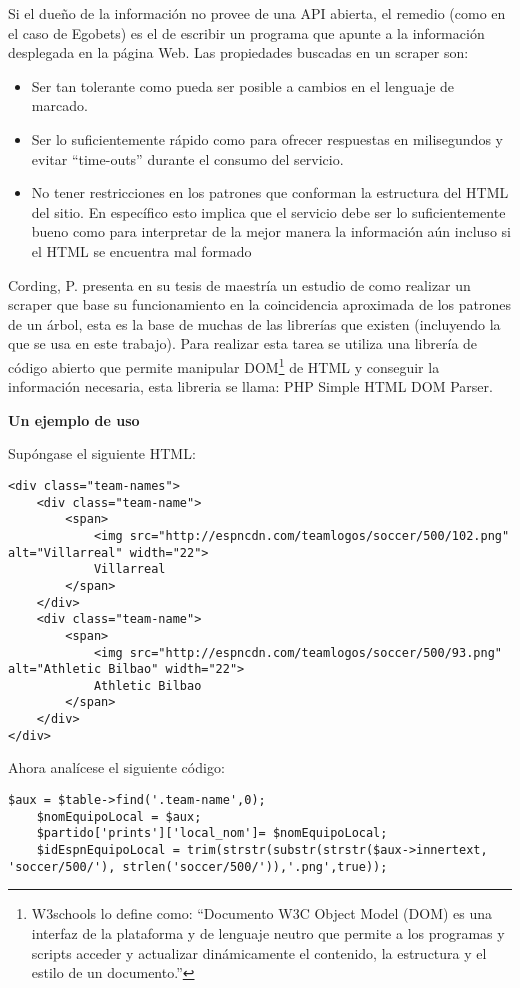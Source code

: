 Si el dueño de la información no provee de una API abierta, el remedio (como en el caso de Egobets) es el de escribir un programa que apunte a la información desplegada en la página Web. Las propiedades buscadas en un scraper son:
\begin{itemize}
	\item Ser tan tolerante como pueda ser posible a cambios en el lenguaje de marcado.
	\item Ser lo suficientemente rápido como para ofrecer respuestas en milisegundos y evitar ``time-outs'' durante el consumo del servicio.
	\item No tener restricciones en los patrones que conforman la estructura del HTML del sitio. En específico esto implica que el servicio debe ser lo suficientemente bueno como para interpretar de la mejor manera la información aún incluso si el HTML se encuentra mal formado
\end{itemize}

Cording, P. \cite{cording2011algorithms} presenta en su tesis de maestría un estudio de como realizar un scraper que base su funcionamiento en la coincidencia aproximada de los patrones de un árbol, esta es la base de muchas de las librerías que existen (incluyendo la que se usa en este trabajo). Para realizar esta tarea se utiliza una librería de código abierto que permite manipular DOM\footnote{W3schools \cite{domWeb} lo define como: ``Documento W3C Object Model (DOM) es una interfaz de la plataforma y de lenguaje neutro que permite a los programas y scripts acceder y actualizar dinámicamente el contenido, la estructura y el estilo de un documento.''} de HTML y conseguir la información necesaria, esta libreria se llama: PHP Simple HTML DOM Parser. 

\textbf{Un ejemplo de uso}

Supóngase el siguiente HTML:

\lstset{language=HTML}
\begin{lstlisting}[frame=single]
<div class="team-names">
	<div class="team-name">
		<span>
			<img src="http://espncdn.com/teamlogos/soccer/500/102.png" alt="Villarreal" width="22">
			Villarreal
		</span>
	</div>
	<div class="team-name">
		<span>
			<img src="http://espncdn.com/teamlogos/soccer/500/93.png" alt="Athletic Bilbao" width="22">
			Athletic Bilbao
		</span>
	</div>
</div>
\end{lstlisting}

Ahora analícese el siguiente código:

\lstset{language=PHP}
\begin{lstlisting}[frame=single]
	$aux = $table->find('.team-name',0);
	$nomEquipoLocal = $aux;
	$partido['prints']['local_nom']= $nomEquipoLocal;
	$idEspnEquipoLocal = trim(strstr(substr(strstr($aux->innertext, 'soccer/500/'), strlen('soccer/500/')),'.png',true));
\end{lstlisting}


